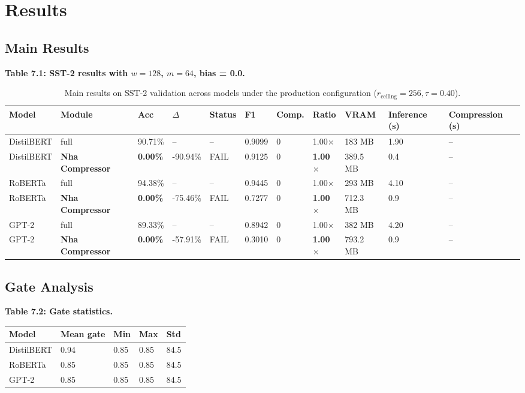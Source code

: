 
\section{Results}

\subsection{Main Results}

\textbf{Table 7.1: SST-2 results with $w = 128$, $m = 64$, bias = 0.0.}

\begin{table}[t]
\centering
\small
\begin{tabular}{lllllllllll}
\toprule
\textbf{Model} & \textbf{Module} & \textbf{Acc} & \textbf{$\Delta$} & \textbf{Status} & \textbf{F1} & \textbf{Comp.} & \textbf{Ratio} & \textbf{VRAM} & \textbf{Inference (s)} & \textbf{Compression (s)} \\
\midrule
DistilBERT & full & 90.71\% & -- & -- & 0.9099 & 0 & 1.00$\times$ & 183 MB & 1.90 & -- \\
DistilBERT & \textbf{Nha Compressor} & \textbf{0.00\%} & -90.94\% & FAIL & 0.9125 & 0 & \textbf{1.00$\times$} & 389.5 MB & 0.4 & -- \\
RoBERTa & full & 94.38\% & -- & -- & 0.9445 & 0 & 1.00$\times$ & 293 MB & 4.10 & -- \\
RoBERTa & \textbf{Nha Compressor} & \textbf{0.00\%} & -75.46\% & FAIL & 0.7277 & 0 & \textbf{1.00$\times$} & 712.3 MB & 0.9 & -- \\
GPT-2 & full & 89.33\% & -- & -- & 0.8942 & 0 & 1.00$\times$ & 382 MB & 4.20 & -- \\
GPT-2 & \textbf{Nha Compressor} & \textbf{0.00\%} & -57.91\% & FAIL & 0.3010 & 0 & \textbf{1.00$\times$} & 793.2 MB & 0.9 & -- \\
\bottomrule
\end{tabular}
\caption{Main results on SST-2 validation across models under the production configuration ($r_{\mathrm{ceiling}}=256, \tau=0.40$).}
\label{tab:main_sst2}
\end{table}

\subsection{Gate Analysis}

\textbf{Table 7.2: Gate statistics.}

\begin{table}[H]
\centering
\small
\begin{tabular}{lllll}
\toprule
\textbf{Model} & \textbf{Mean gate} & \textbf{Min} & \textbf{Max} & \textbf{Std} \\
\midrule
DistilBERT & 0.94 & 0.85 & 0.85 & 84.5 \\
RoBERTa & 0.85 & 0.85 & 0.85 & 84.5 \\
GPT-2 & 0.85 & 0.85 & 0.85 & 84.5 \\
\bottomrule
\end{tabular}
\end{table}

